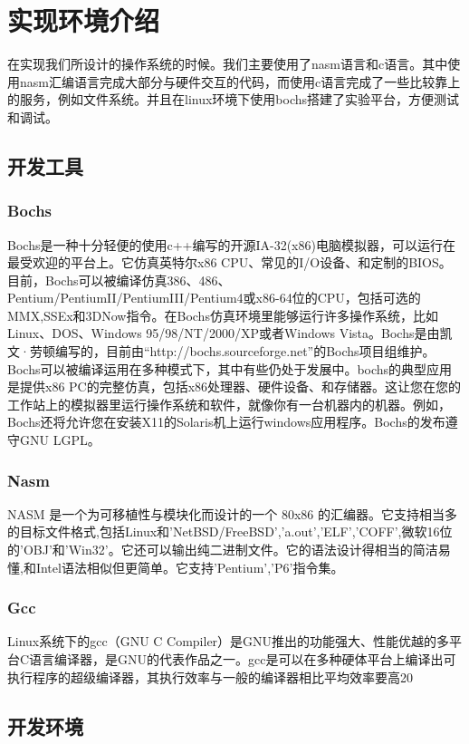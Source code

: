 \documentclass[UTF8,nofonts,cs4size]{ctexrep}
\begin{document}
\section{实现环境介绍}
在实现我们所设计的操作系统的时候。我们主要使用了nasm语言和c语言。其中使用nasm汇编语言完成大部分与硬件交互的代码，而使用c语言完成了一些比较靠上的服务，例如文件系统。并且在linux环境下使用bochs搭建了实验平台，方便测试和调试。
\subsection{开发工具}
\subsubsection{Bochs}
Bochs是一种十分轻便的使用c++编写的开源IA-32(x86)电脑模拟器，可以运行在最受欢迎的平台上。它仿真英特尔x86 CPU、常见的I/O设备、和定制的BIOS。目前，Bochs可以被编译仿真386、486、Pentium/PentiumII/PentiumIII/Pentium4或x86-64位的CPU，包括可选的MMX,SSEx和3DNow指令。在Bochs仿真环境里能够运行许多操作系统，比如Linux、DOS、Windows 95/98/NT/2000/XP或者Windows Vista。Bochs是由凯文·劳顿编写的，目前由“http://bochs.sourceforge.net”的Bochs项目组维护。Bochs可以被编译运用在多种模式下，其中有些仍处于发展中。bochs的典型应用是提供x86 PC的完整仿真，包括x86处理器、硬件设备、和存储器。这让您在您的工作站上的模拟器里运行操作系统和软件，就像你有一台机器内的机器。例如，Bochs还将允许您在安装X11的Solaris机上运行windows应用程序。Bochs的发布遵守GNU LGPL。
\subsubsection{Nasm}
NASM 是一个为可移植性与模块化而设计的一个 80x86 的汇编器。它支持相当多的目标文件格式,包括Linux和'NetBSD/FreeBSD','a.out','ELF','COFF',微软16位的'OBJ'和'Win32'。它还可以输出纯二进制文件。它的语法设计得相当的简洁易懂,和Intel语法相似但更简单。它支持'Pentium','P6'指令集。
\subsubsection{Gcc}
Linux系统下的gcc（GNU C Compiler）是GNU推出的功能强大、性能优越的多平台C语言编译器，是GNU的代表作品之一。gcc是可以在多种硬体平台上编译出可执行程序的超级编译器，其执行效率与一般的编译器相比平均效率要高20%
\subsection{开发环境}
\end{document}
